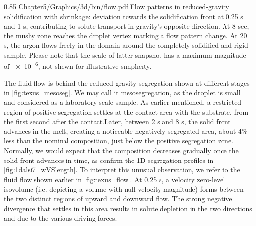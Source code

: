\begin{figureth}
{0.85}
{Chapter5/Graphics/3d/bin/flow.pdf}
{Flow patterns in reduced-gravity solidification with shrinkage: 
deviation towards the solidification front at 0.25 s and 1 s, contributing to solute transport in gravity's opposite direction.
At 8 sec, the mushy zone reaches the droplet vertex marking a flow pattern change. 
At 20 s, the argon flows freely in the domain around the completely solidified and rigid sample.
Please note that the scale of latter snapshot has a maximum magnitude of \SI{e-6}{\uvelocity}, not shown
for illustrative simplicity.}
\label{fig:texus_flow}
\end{figureth}

The fluid flow is behind the reduced-gravity segregation shown at different stages in \cref{fig:texus_mesoseg}.
We may call it mesosegregation, as the droplet is small and considered as a laboratory-scale sample.
As earlier mentioned, a restricted region of positive segregation settles at the contact area with the substrate,
from the first second after the contact.Later, between 2 s and 8 s, the solid front advances in the melt, creating 
a noticeable negatively segregated area, about 4\% less than the nominal composition, just below the positive segregation zone.
Normally, we would expect that the composition decreases gradually once the solid front advances in time, as confirm the 1D segregation
profiles in \cref{fig:1dalsi7_wVSlength}. To interpret this unusual observation, we refer to the fluid flow shown earlier in \cref{fig:texus_flow}.
At 0.25 s, a velocity zero-level isovolume (i.e. depicting a volume with null velocity magnitude) forms between the two distinct regions
of upward and downward flow. The strong negative divergence that settles in this area results in solute depletion in the two directions
and due to the various driving forces. 

